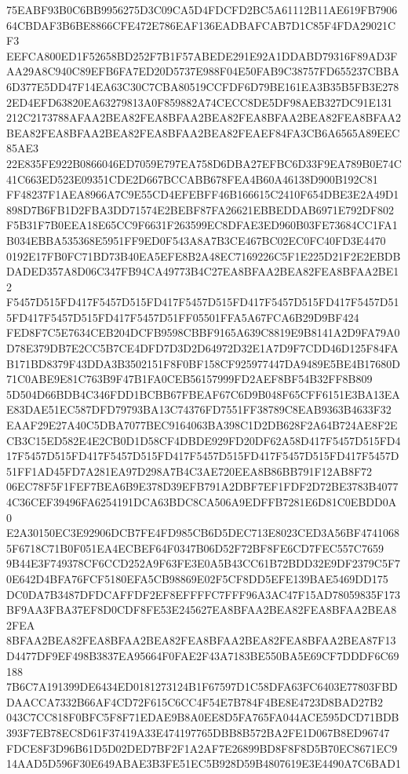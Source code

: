 \documentclass[UTF8,fontset=fandol,zihao=-4,a4paper]{ctexart}
\begin{document}
{{75EABF93B0C6BB9956275D3C09CA5D4FDCFD2BC5A61112B11AE619FB790664CBDAF3B6BE8866CFE472E786EAF136EADBAFCAB7D1C85F4FDA29021CF3
EEFCA800ED1F52658BD252F7B1F57ABEDE291E92A1DDABD79316F89AD3FAA29A8C940C89EFB6FA7ED20D5737E988F04E50FAB9C38757FD655237CBBA
6D377E5DD47F14EA63C30C7CBA80519CCFDF6D79BE161EA3B35B5FB3E2782ED4EFD63820EA63279813A0F859882A74CECC8DE5DF98AEB327DC91E131
212C2173788AFAA2BEA82FEA8BFAA2BEA82FEA8BFAA2BEA82FEA8BFAA2BEA82FEA8BFAA2BEA82FEA8BFAA2BEA82FEAEF84FA3CB6A6565A89EEC85AE3
22E835FE922B0866046ED7059E797EA758D6DBA27EFBC6D33F9EA789B0E74C41C663ED523E09351CDE2D667BCCABB678FEA4B60A46138D900B192C81
FF48237F1AEA8966A7C9E55CD4EFEBFF46B166615C2410F654DBE3E2A49D1898D7B6FB1D2FBA3DD71574E2BEBF87FA26621EBBEDDAB6971E792DF802
F5B31F7B0EEA18E65CC9F6631F263599EC8DFAE3ED960B03FE73684CC1FA1B034EBBA535368E5951FF9ED0F543A8A7B3CE467BC02EC0FC40FD3E4470
0192E17FB0FC71BD73B40EA5EFE8B2A48EC7169226C5F1E225D21F2E2EBDBDADED357A8D06C347FB94CA49773B4C27EA8BFAA2BEA82FEA8BFAA2BE12
F5457D515FD417F5457D515FD417F5457D515FD417F5457D515FD417F5457D515FD417F5457D515FD417F5457D51FF05501FFA5A67FCA6B29D9BF424
FED8F7C5E7634CEB204DCFB9598CBBF9165A639C8819E9B8141A2D9FA79A0D78E379DB7E2CC5B7CE4DFD7D3D2D64972D32E1A7D9F7CDD46D125F84FA
B171BD8379F43DDA3B3502151F8F0BF158CF925977447DA9489E5BE4B17680D71C0ABE9E81C763B9F47B1FA0CEB56157999FD2AEF8BF54B32FF8B809
5D504D66BDB4C346FDD1BCBB67FBEAF67C6D9B048F65CFF6151E3BA13EAE83DAE51EC587DFD79793BA13C74376FD7551FF38789C8EAB9363B4633F32
EAAF29E27A40C5DBA7077BEC9164063BA398C1D2DB628F2A64B724AE8F2ECB3C15ED582E4E2CB0D1D58CF4DBDE929FD20DF62A58D417F5457D515FD4
17F5457D515FD417F5457D515FD417F5457D515FD417F5457D515FD417F5457D51FF1AD45FD7A281EA97D298A7B4C3AE720EEA8B86BB791F12AB8F72
06EC78F5F1FEF7BEA6B9E378D39EFB791A2DBF7EF1FDF2D72BE3783B40774C36CEF39496FA6254191DCA63BDC8CA506A9EDFFB7281E6D81C0EBDD0A0
E2A30150EC3E92906DCB7FE4FD985CB6D5DEC713E8023CED3A56BF47410685F6718C71B0F051EA4ECBEF64F0347B06D52F72BF8FE6CD7FEC557C7659
9B44E3F749378CF6CCD252A9F63FE3E0A5B43CC61B72BDD32E9DF2379C5F70E642D4BFA76FCF5180EFA5CB98869E02F5CF8DD5EFE139BAE5469DD175
DC0DA7B3487DFDCAFFDF2EF8EFFFFC7FFF96A3AC47F15AD78059835F173BF9AA3FBA37EF8D0CDF8FE53E245627EA8BFAA2BEA82FEA8BFAA2BEA82FEA
8BFAA2BEA82FEA8BFAA2BEA82FEA8BFAA2BEA82FEA8BFAA2BEA87F13D4477DF9EF498B3837EA95664F0FAE2F43A7183BE550BA5E69CF7DDDF6C69188
7B6C7A191399DE6434ED0181273124B1F67597D1C58DFA63FC6403E77803FBDDAACCA7332B66AF4CD72F615C6CC4F54E7B784F4BE8E4723D8BAD27B2
043C7CC818F0BFC5F8F71EDAE9B8A0EE8D5FA765FA044ACE595DCD71BDB393F7EB78EC8D61F37419A33E474197765DBB8B572BA2FE1D067B8ED96747
FDCE8F3D96B61D5D02DED7BF2F1A2AF7E26899BD8F8F8D5B70EC8671EC914AAD5D596F30E649ABAE3B3FE51EC5B928D59B4807619E3E4490A7C6BAD1
}}
\end{document}
